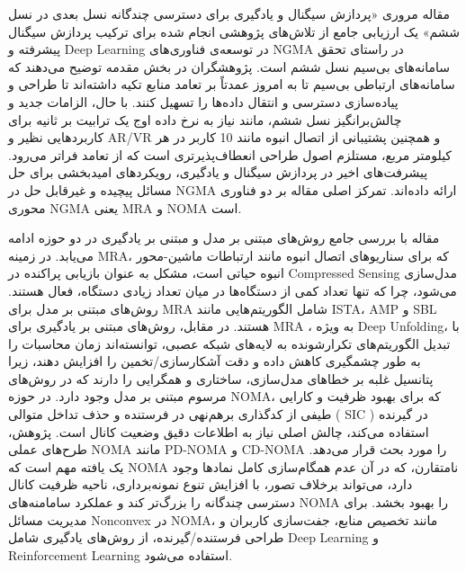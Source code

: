 مقاله مروری «پردازش سیگنال و یادگیری برای دسترسی چندگانه نسل بعدی در نسل ششم» یک ارزیابی جامع از تلاش‌های پژوهشی انجام شده برای ترکیب پردازش سیگنال پیشرفته و 
\gls{Deep Learning}
 در توسعه‌ی فناوری‌های 
\gls{NGMA}
  در راستای تحقق سامانه‌های بی‌سیم نسل ششم است.
پژوهشگران در بخش مقدمه توضیح می‌دهند که سامانه‌های ارتباطی بی‌سیم تا به امروز عمدتاً بر تعامد منابع تکیه داشته‌اند تا طراحی و پیاده‌سازی دسترسی و انتقال داده‌ها را تسهیل کنند. با  حال، الزامات جدید و چالش‌برانگیز نسل ششم، مانند نیاز به نرخ داده اوج یک ترابیت بر ثانیه برای کاربردهایی نظیر و
\gls{AR}/\gls{VR}
 و همچنین پشتیبانی از اتصال انبوه مانند 10 
کاربر در هر کیلومتر مربع، مستلزم اصول طراحی انعطاف‌پذیرتری است که از تعامد فراتر می‌رود. پیشرفت‌های اخیر در پردازش سیگنال و یادگیری، رویکردهای امیدبخشی برای حل  مسائل پیچیده و غیرقابل حل در 
\gls{NGMA}
 ارائه داده‌اند. تمرکز اصلی  مقاله بر دو فناوری محوری 
\gls{NGMA}
  یعنی  
\gls{MRA}
   و
\gls{NOMA}
   است.
   
مقاله با بررسی جامع روش‌های مبتنی بر مدل و مبتنی بر یادگیری در  دو حوزه ادامه می‌یابد. در زمینه 
\gls{MRA}،
 که برای سناریوهای اتصال انبوه مانند ارتباطات ماشین-محور انبوه حیاتی است، مشکل به عنوان بازیابی پراکنده در 
\gls{Compressed Sensing}
  مدل‌سازی می‌شود، چرا که تنها تعداد کمی از دستگاه‌ها در میان تعداد زیادی دستگاه، فعال هستند. روش‌های مبتنی بر مدل برای 
\gls{MRA}
   شامل الگوریتم‌هایی مانند ISTA، AMP و SBL هستند. در مقابل، روش‌های مبتنی بر یادگیری برای 
\gls{MRA}
   ، به ویژه 
\gls{Deep Unfolding}،
    با تبدیل الگوریتم‌های تکرارشونده به لایه‌های شبکه عصبی، توانسته‌اند زمان محاسبات را به طور چشمگیری کاهش داده و دقت آشکارسازی/تخمین را افزایش دهند، زیرا پتانسیل غلبه بر خطاهای مدل‌سازی، ساختاری و همگرایی را دارند که در روش‌های مرسوم مبتنی بر مدل وجود دارد.
در حوزه 
\gls{NOMA}،
 که برای بهبود ظرفیت و کارایی طیفی از کدگذاری برهم‌نهی در فرستنده و حذف تداخل متوالی (
\gls{SIC}
 ) در گیرنده استفاده می‌کند، چالش اصلی نیاز به اطلاعات دقیق وضعیت کانال است.  پژوهش، طرح‌های عملی 
\gls{NOMA}
  مانند 
\gls{PD-NOMA}
   و 
\gls{CD-NOMA}
   را مورد بحث قرار می‌دهد. یک یافته مهم است که 
\gls{NOMA}
    نامتقارن، که در آن عدم همگام‌سازی کامل نمادها وجود دارد، می‌تواند برخلاف تصور، با افزایش تنوع نمونه‌برداری، ناحیه ظرفیت کانال دسترسی چندگانه را بزرگ‌تر کند و عملکرد سامامنه‌های 
\gls{NOMA}
     را بهبود بخشد. برای مدیریت مسائل 
\gls{Nonconvex}
      در 
\gls{NOMA}،
       مانند تخصیص منابع، جفت‌سازی کاربران و طراحی فرستنده/گیرنده، از روش‌های یادگیری شامل 
\gls{Deep Learning}
 و 
\gls{Reinforcement Learning}
  استفاده می‌شود.

